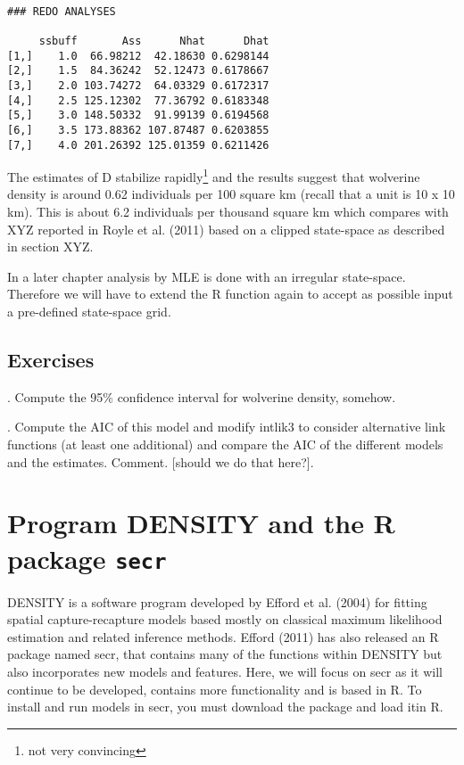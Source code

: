   
\begin{verbatim}

### REDO ANALYSES 

     ssbuff       Ass      Nhat      Dhat
[1,]    1.0  66.98212  42.18630 0.6298144
[2,]    1.5  84.36242  52.12473 0.6178667
[3,]    2.0 103.74272  64.03329 0.6172317
[4,]    2.5 125.12302  77.36792 0.6183348
[5,]    3.0 148.50332  91.99139 0.6194568
[6,]    3.5 173.88362 107.87487 0.6203855
[7,]    4.0 201.26392 125.01359 0.6211426

\end{verbatim}

The estimates of D stabilize rapidly\footnote{not very convincing} and
the results suggest that wolverine density is around 0.62 individuals
per 100 square km (recall that a unit is 10 x 10 km).  This is about
6.2 individuals per thousand square km which compares with XYZ
reported in Royle et al. (2011) based on a clipped state-space as
described in section XYZ.

In a later chapter analysis by MLE is done with an irregular
state-space. Therefore we will have to extend the R function again to
accept as possible input a pre-defined state-space grid.

\subsection{
Exercises
}

{.	Compute the 95\% confidence interval for wolverine density, somehow.
}

{.	Compute the AIC of this model and modify intlik3 to consider alternative link functions (at least one additional) and compare the AIC of the different models and the estimates. Comment. [should we do that here?].
}

\section{Program DENSITY and the R package \mbox{\tt secr} }

DENSITY is a software program developed by Efford et al. (2004) for
fitting spatial capture-recapture models based mostly on classical
maximum likelihood estimation and related inference methods.  Efford
(2011) has also released an R package named secr, that contains many
of the functions within DENSITY but also incorporates new models and
features.  Here, we will focus on secr as it will continue to be
developed, contains more functionality and is based in R.  To install
and run models in secr, you must download the package and load itin R.

